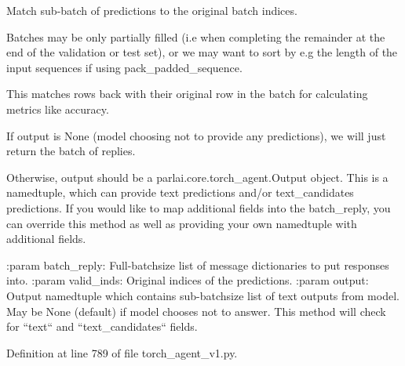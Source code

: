 \begin{DoxyVerb}Match sub-batch of predictions to the original batch indices.

Batches may be only partially filled (i.e when completing the remainder
at the end of the validation or test set), or we may want to sort by
e.g the length of the input sequences if using pack_padded_sequence.

This matches rows back with their original row in the batch for
calculating metrics like accuracy.

If output is None (model choosing not to provide any predictions), we
will just return the batch of replies.

Otherwise, output should be a parlai.core.torch_agent.Output object.
This is a namedtuple, which can provide text predictions and/or
text_candidates predictions. If you would like to map additional
fields into the batch_reply, you can override this method as well as
providing your own namedtuple with additional fields.

:param batch_reply: Full-batchsize list of message dictionaries to put
    responses into.
:param valid_inds: Original indices of the predictions.
:param output: Output namedtuple which contains sub-batchsize list of
    text outputs from model. May be None (default) if model chooses not
    to answer. This method will check for ``text`` and
    ``text_candidates`` fields.
\end{DoxyVerb}
 

Definition at line 789 of file torch\+\_\+agent\+\_\+v1.\+py.


